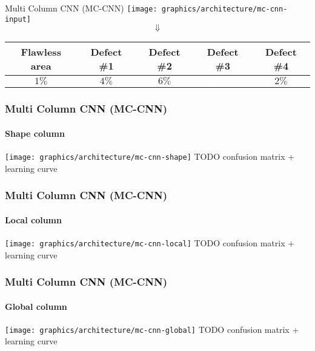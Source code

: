 \begin{frame}{Multi Column CNN (MC-CNN)}
    \texttt{[image: graphics/architecture/mc-cnn-input]}
    $$\Downarrow$$
    \centering
    \begin{tabular}{|c|c|c|c|c|}
        \hline
        Flawless area & Defect \#1 & Defect \#2 & Defect \#3 & Defect \#4\\\hline
        $1\%$ & $4\%$ & $6\%$ & \cellcolor{UniBlue}\textcolor{white}{$87\%$} & $2\%$ \\
        \hline
    \end{tabular}
\end{frame}

\begin{frame}
    \frametitle{Multi Column CNN (MC-CNN)}
    \framesubtitle{Shape column}
    \texttt{[image: graphics/architecture/mc-cnn-shape]}
    TODO confusion matrix + learning curve
\end{frame}

\begin{frame}
    \frametitle{Multi Column CNN (MC-CNN)}
    \framesubtitle{Local column}
    \texttt{[image: graphics/architecture/mc-cnn-local]}
    TODO confusion matrix + learning curve
\end{frame}

\begin{frame}
    \frametitle{Multi Column CNN (MC-CNN)}
    \framesubtitle{Global column}
    \texttt{[image: graphics/architecture/mc-cnn-global]}
    TODO confusion matrix + learning curve
\end{frame}

